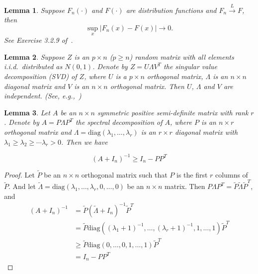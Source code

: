 \documentclass[review]{elsarticle}
\theoremstyle{plain}
\newtheorem{lemma}{Lemma}
\theoremstyle{definition}
\theoremstyle{remark}
\begin{document}
\begin{lemma}\label{uniformLemma}
    Suppose $F_n(\cdot)$ and $F(\cdot)$ are distribution functions and $F_n\xrightarrow{L}F$, then
    \begin{equation}
        \sup_x |F_n(x)-F(x)|\to 0.
    \end{equation}
    See Exercise 3.2.9 of~\cite{durrett2010probability}.
\end{lemma}
\begin{lemma}\label{svdLemma}
    Suppose $Z$ is an $p\times n$ ($p\geq n$) random matrix with all elements i.i.d.\ distributed as $N(0,1)$. Denote by $Z=U\Lambda V^T$ the singular value decomposition (SVD) of $Z$, where $U$ is a $p\times n$ orthogonal matrix, $\Lambda$ is an $n\times n$ diagonal matrix and $V$ is an $n\times n$ orthogonal matrix. Then $U$, $\Lambda$ and $V$ are independent. (See, e.g.,~\cite{Eaton1983Multivariate})
\end{lemma}

\begin{lemma}\label{wangInverse}
    Let $A$ be an $n\times n$ symmetric positive semi-definite matrix with rank $r$. Denote by $A=P\Lambda P^T$ the spectral decomposition of $A$, where $P$ is an $n\times r$ orthogonal matrix and $\Lambda=\textrm{diag}(\lambda_1,\ldots,\lambda_r)$ is an $r\times r$ diagonal matrix with $\lambda_1\geq \lambda_2\geq\cdots \lambda_r >0$. Then we have

\begin{equation}
    {(A+I_{n})}^{-1}\geq I_n- P P^T
\end{equation}
\end{lemma}
\begin{proof}
    Let $\tilde{P}$ be an $n\times n$ orthogonal matrix such that $P$ is the first $r$ columns of $\tilde{P}$. And let $\tilde{\Lambda}=\textrm{diag}(\lambda_1,\ldots,\lambda_r,0,\ldots,0)$ be an $n\times n$ matrix. Then $P\Lambda P^T=\tilde{P}\tilde{\Lambda} \tilde{P}^T$, and
    \begin{equation}
        \begin{aligned}
            {(A+I_{n})}^{-1}&=\tilde{P} {(\tilde{\Lambda} + I_n)}^{-1} \tilde{P}^T\\
            &=\tilde{P}\textrm{diag}({(\lambda_1+1)}^{-1},\ldots,{(\lambda_r+1)}^{-1},1,\ldots,1)  \tilde{P}^T\\
            &\geq\tilde{P}\textrm{diag}(0,\ldots,0,1,\ldots,1)  \tilde{P}^T\\
            &=I_n-PP^T
        \end{aligned}
    \end{equation}
\end{proof}
\end{document}
